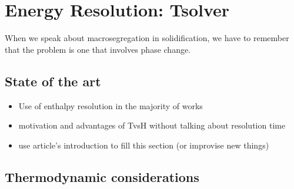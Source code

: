 \chapter{Energy Resolution: Tsolver}
\minitoc
\newpage


When we speak about macrosegregation in solidification, we have to remember that the problem is one that involves phase change.


\section{State of the art}
\begin{itemize}
\item Use of enthalpy resolution in the majority of works 
\item motivation and advantages of TvsH without talking about resolution time
\item use article's introduction to fill this section (or improvise new things)
\end{itemize}


\section{Thermodynamic considerations}
